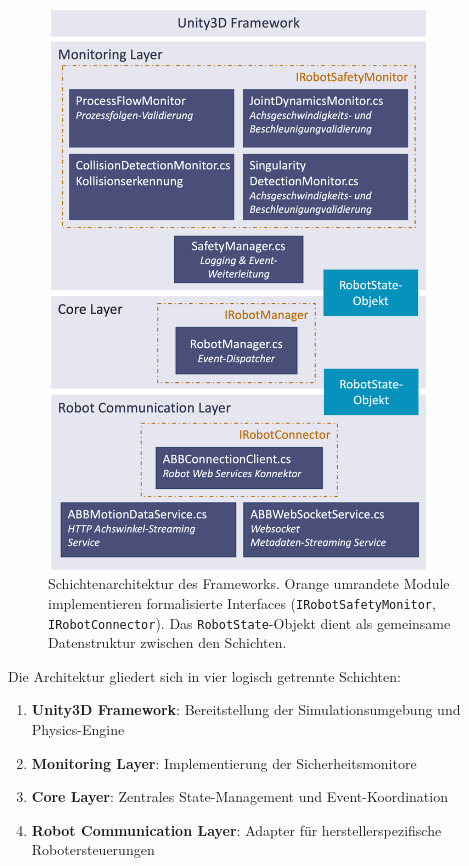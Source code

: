 \begin{figure}[H]
	\centering
	\includegraphics[width=10cm]{figures/LayerArchitekturFramework.png}
	\caption{Schichtenarchitektur des Frameworks. Orange umrandete Module implementieren formalisierte Interfaces (\texttt{IRobotSafetyMonitor}, \texttt{IRobotConnector}). Das \texttt{RobotState}-Objekt dient als gemeinsame Datenstruktur zwischen den Schichten.}
	\label{fig:layer_architecture}
\end{figure}

Die Architektur gliedert sich in vier logisch getrennte Schichten:

\begin{enumerate}
	\item \textbf{Unity3D Framework}: Bereitstellung der Simulationsumgebung und Physics-Engine
	\item \textbf{Monitoring Layer}: Implementierung der Sicherheitsmonitore
	\item \textbf{Core Layer}: Zentrales State-Management und Event-Koordination
	\item \textbf{Robot Communication Layer}: Adapter für herstellerspezifische Robotersteuerungen
\end{enumerate}

